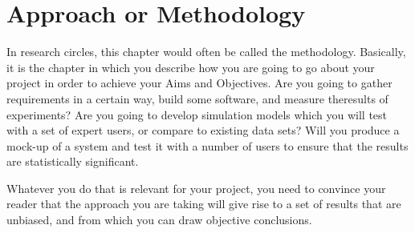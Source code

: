 %
%

\chapter{Approach or Methodology}

In research circles, this chapter would often be called the methodology.
Basically, it is the chapter in which you describe how you are going to go
about your project in order to achieve your Aims and Objectives.  Are you going
to gather requirements in a certain way, build some software, and measure
theresults of experiments?  Are you going to develop simulation models which
you will test with a set of expert users, or compare to existing data sets?
Will you produce a mock-up of a system and test it with a number of users to
ensure that the results are statistically significant.

Whatever you do that is relevant for your project, you need to convince your
reader that the approach you are taking will give rise to a set of results that
are unbiased, and from which you can draw objective conclusions.
